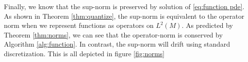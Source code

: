 \documentclass[final,leqno]{siamltex1213}
\begin{document}
Finally, we know that the sup-norm is preserved by solution of \eqref{eq:function pde}.
As shown in Theorem \ref{thm:quantize}, the sup-norm is equivalent to the operator norm when we represent functions as operators on $L^{2}(M)$.
As predicted by Theorem \ref{thm:norms}, we can see that the operator-norm is conserved by Algorithm \ref{alg:function}.
In contrast, the sup-norm will drift using standard discretization.  This is all depicted in figure \ref{fig:norms}


%
\end{document}
